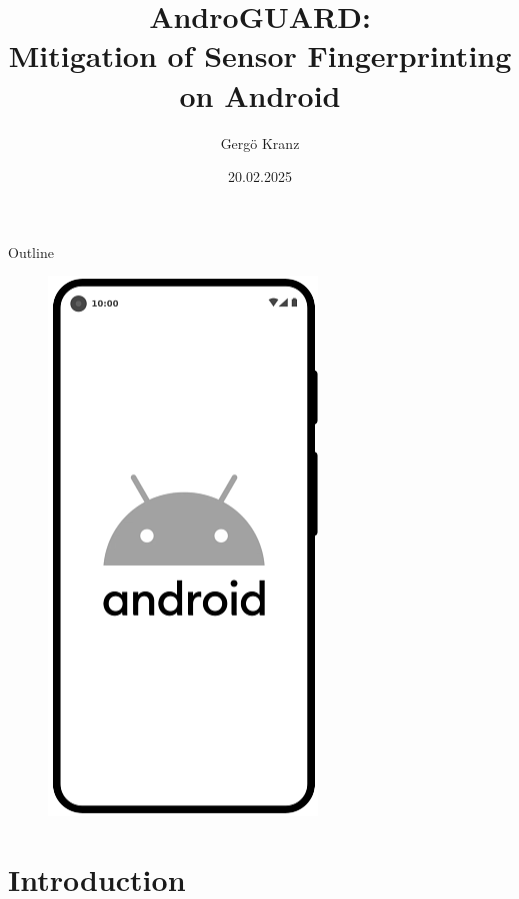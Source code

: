 \documentclass[aspectratio=169]{beamer}
[aspectratio=169] %
\title[AndroGUARD]{AndroGUARD:\\Mitigation of Sensor Fingerprinting\\on Android}
\author{Gergö Kranz}
\date{20.02.2025}
\institute{IAIK}
\begin{document}
\begin{frame}[plain]
  \maketitle
\end{frame}


\begin{frame}{Outline}
  \begin{minipage}{0.49\textwidth} 
    \tableofcontents
  \end{minipage}
  \hfill
  \begin{minipage}{0.49\textwidth} 
    \begin{figure}
      \centering
      \includegraphics[height=0.5\textheight]{figures/android_device.png}
    \end{figure}
  \end{minipage}
\end{frame}


\section{Introduction}
\end{document}
